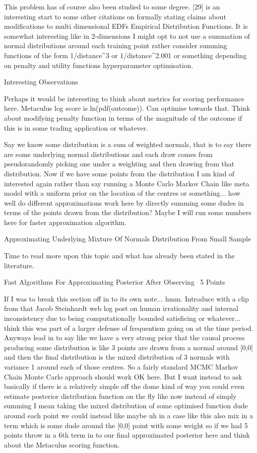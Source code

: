 This problem has of course also been studied to some degree. [29] is an interesting start to some other citations on formally stating claims about modifications to multi dimensional EDFs Empirical Distribution Functions. It is somewhat interesting like in 2-dimensions I might opt to not use a summation of normal distributions around each training point rather consider summing functions of the form 1/distance^3 or 1/distance^2.001 or something depending on penalty and utility functions hyperparameter optimisation.

	Interesting Observations

Perhaps it would be interesting to think about metrics for scoring performance here. Metaculus log score is ln(pdf(outcome)). Can optimise towards that. Think about modifying penalty function in terms of the magnitude of the outcome if this is in some trading application or whatever.

Say we know some distribution is a sum of weighted normals, that is to say there are some underlying normal distributions and each draw comes from pseudorandomly picking one under a weighting and then drawing from that distribution. Now if we have some points from the distribution I am kind of interested again rather than say running a Monte Carlo Markov Chain like meta model with a uniform prior on the location of the centres or something... how well do different approximations work here by directly summing some dudes in terms of the points drawn from the distribution? Maybe I will run some numbers here for faster approximation algorithm.

	Approximating Underlying Mixture Of Normals Distribution From Small Sample

Time to read more upon this topic and what has already been stated in the literature.

	Fast Algorithms For Approximating Posterior After Observing ~5 Points

If I was to break this section off in to its own note... hmm. Introduce with a clip from that Jacob Steinhardt web log post on human irrationality and internal inconsistency due to being computationally bounded satisficing or whatever... think this was part of a larger defense of frequentism going on at the time period. Anyways lead in to say like we have a very strong prior that the causal process producing some distribution is like 3 points are drawn from a normal around [0,0] and then the final distribution is the mixed distribution of 3 normals with variance 1 around each of those centres. So a fairly standard MCMC Markov Chain Monte Carlo approach should work OK here. But I want instead to ask basically if there is a relatively simple off the dome kind of way you could even estimate posterior distribution function on the fly like now instead of simply summing I mean taking the mixed distribution of some optimised function dude around each point we could instead like maybe uh in a case like this also mix in a term which is some dude around the [0,0] point with some weight so if we had 5 points throw in a 6th term in to our final approximated posterior here and think about the Metaculus scoring function.


